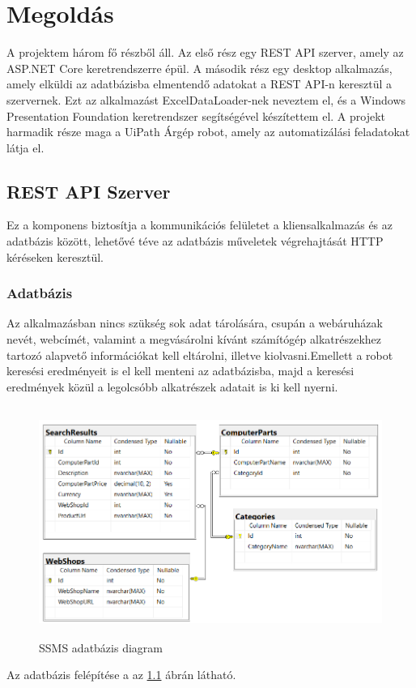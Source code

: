 \documentclass[
]{thesis-ekf}
\theoremstyle{definition}
\theoremstyle{remark}
\begin{document}
\chapter{Megoldás}
A projektem három fő részből áll. Az első rész egy REST API szerver, amely az ASP.NET Core keretrendszerre épül. A második rész egy desktop alkalmazás, amely elküldi az adatbázisba elmentendő adatokat a REST API-n keresztül a szervernek. Ezt az alkalmazást ExcelDataLoader-nek neveztem el, és a Windows Presentation Foundation keretrendszer segítségével készítettem el. A projekt harmadik része maga a UiPath Árgép robot, amely az automatizálási feladatokat látja el.
\section{REST API Szerver}
Ez a komponens biztosítja a kommunikációs felületet a kliensalkalmazás és az adatbázis között, lehetővé téve az adatbázis műveletek végrehajtását HTTP kéréseken keresztül.
\subsection{Adatbázis}
Az alkalmazásban nincs szükség sok adat tárolására, csupán a webáruházak nevét, webcímét, valamint a megvásárolni kívánt számítógép alkatrészekhez tartozó alapvető információkat kell eltárolni, illetve kiolvasni.Emellett a robot keresési eredményeit is el kell menteni az adatbázisba, majd a keresési eredmények közül a legolcsóbb alkatrészek adatait is ki kell nyerni.
	\begin{figure}[!ht]
		\centering
		\includegraphics[width=15cm, height=7.5cm]{entity_diagram}
		\caption{SSMS adatbázis diagram}
		\label{picture-adatbazis}
	\end{figure}
Az adatbázis felépítése a az \ref{picture-adatbazis} ábrán látható. 
\end{document}
